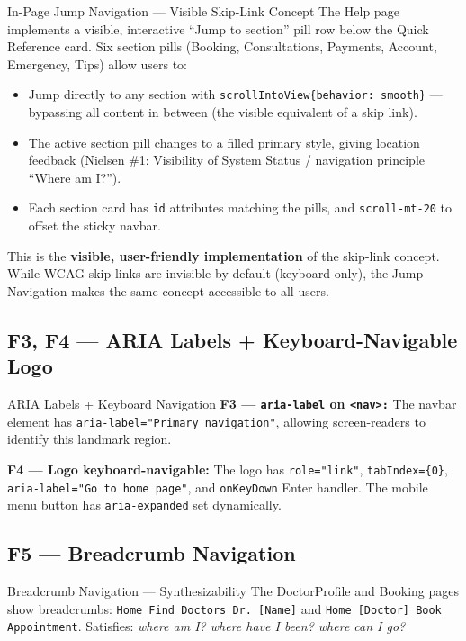 \documentclass[12pt, a4paper]{article}
\begin{document}
\begin{featurebox}{In-Page Jump Navigation --- Visible Skip-Link Concept}
The Help page implements a visible, interactive ``Jump to section'' pill row below the Quick Reference card. Six section pills (Booking, Consultations, Payments, Account, Emergency, Tips) allow users to:\begin{itemize}[leftmargin=1.5em, itemsep=0pt]
  \item Jump directly to any section with \texttt{scrollIntoView\{behavior: smooth\}} --- bypassing all content in between (the visible equivalent of a skip link).
  \item The active section pill changes to a filled primary style, giving location feedback (Nielsen \#1: Visibility of System Status / navigation principle ``Where am I?'').
  \item Each section card has \texttt{id} attributes matching the pills, and \texttt{scroll-mt-20} to offset the sticky navbar.
\end{itemize}

This is the \textbf{visible, user-friendly implementation} of the skip-link concept. While WCAG skip links are invisible by default (keyboard-only), the Jump Navigation makes the same concept accessible to all users.
\end{featurebox}

\subsection{F3, F4 --- ARIA Labels + Keyboard-Navigable Logo}

\begin{featurebox}{ARIA Labels + Keyboard Navigation}
\textbf{F3 --- \texttt{aria-label} on \texttt{\textless{}nav\textgreater{}:}} The navbar element has \texttt{aria-label="Primary navigation"}, allowing screen-readers to identify this landmark region.

\textbf{F4 --- Logo keyboard-navigable:} The logo has \texttt{role="link"}, \texttt{tabIndex=\{0\}}, \texttt{aria-label="Go to home page"}, and \texttt{onKeyDown} Enter handler. The mobile menu button has \texttt{aria-expanded} set dynamically.
\end{featurebox}

\subsection{F5 --- Breadcrumb Navigation}

\begin{featurebox}{Breadcrumb Navigation --- Synthesizability}
The DoctorProfile and Booking pages show breadcrumbs: \texttt{Home \textrightarrow{} Find Doctors \textrightarrow{} Dr. [Name]} and \texttt{Home \textrightarrow{} [Doctor] \textrightarrow{} Book Appointment}. Satisfies: \textit{where am I? where have I been? where can I go?}
\end{featurebox}
\end{document}
